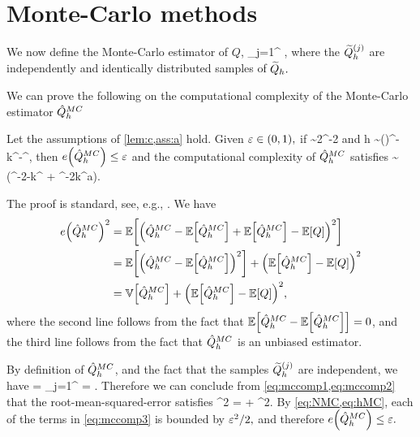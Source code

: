 \section{Monte-Carlo methods}\label{sec:mc}

We now define the Monte-Carlo estimator of $Q$,
\beqs
\QhatMC \de {} \sum_{j=1}^{\NMC} \Qhtildesj,
\eeqs
where the $\widetilde{Q}_{h}^{(j)}$ are independently and identically distributed samples of $\widetilde{Q}_{h}.$

We can prove the following  on the computational complexity of the Monte-Carlo estimator $\hat{Q}^{MC}_{h}$

\label{thm:hhmc}
Let the assumptions of \cref{lem:c,ass:a} hold. Given $\varepsilon \in (0,1),$ if
\beq\label{eq:NMC}
\NMC  \sim 2\VAR{\Qhtilde}\eps^{-2}
\eeq
and
\beq\label{eq:hMC}
h \sim \mleft(\co\mright)^{-}k^{-\frac\sigma\alpha}\eps^{},
\eeq
then $\err{\QhatMC} \leq \eps$ and the computational complexity of $\hat{Q}^{MC}_{h}$ satisfies
\beqs
\EXP{\CMC} \sim \VAR{\Qhtilde}\mleft(\eps^{-2-\frac{\gamma}{\alpha}}k^{\frac{\gamma\sigma}\alpha} + \eps^{-2}k^{a\gamma}\mright).
\eeqs
\enth

The proof is standard, see, e.g., \cite[Section 2.1]{ClGiScTe:11}. We have
\begin{align}
\err{\QhatMC}^2 &= \EXP{\mleft(\QhatMC - \EXP{\QhatMC} + \EXP{\QhatMC} - \EXP{Q}\mright)^2}\nonumber\\
&= \EXP{\mleft(\QhatMC - \EXP{\QhatMC}\mright)^2} + \mleft(\EXP{\QhatMC} - \EXP{Q}\mright)^2\nonumber\\
&= \VAR{\QhatMC} + \mleft(\EXP{\QhatMC} - \EXP{Q}\mright)^2,\label{eq:mccomp1}
\end{align}
where the second line follows from the fact that $\EXP{\QhatMC - \EXP{\QhatMC}} = 0$, and the third line follows from the fact that $\hat{Q}^{MC}_{h}$ is an unbiased estimator.

By definition of $\hat{Q}^{MC}_{h}$, and the fact that the samples $\widetilde{Q}_{h}^{(j)}$ are independent, we have
\beq\label{eq:mccomp2}
\VAR{\QhatMC} = \sum_{j=1}^{\NMC}\VAR{\Qhtildesj} =  \VAR{\Qhtilde}.
\eeq
Therefore we can conclude from \cref{eq:mccomp1,eq:mccomp2} that the root-mean-squared-error satisfies
\beq\label{eq:mccomp3}
\err{\QhatMC}^2 = \VAR{\Qhtilde} + ^2.
\eeq
By \cref{eq:NMC,eq:hMC}, each of the terms in \cref{eq:mccomp3} is bounded by  $\varepsilon^2/2,$ and therefore $\err{\QhatMC} \leq \eps.$

